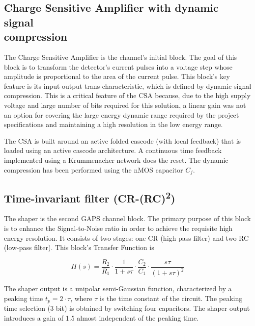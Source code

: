 
\subsection[Charge Sensitive Amplifier with dynamic signal compression]{Charge Sensitive Amplifier with dynamic signal \\compression}
The Charge Sensitive Amplifier is the channel's initial block. The goal of this block is to transform the detector's current pulses into a voltage step whose amplitude is proportional to the area of the current pulse. This block's key feature is its input-output trans-characteristic, which is defined by  dynamic signal compression. This is a critical feature of the CSA because, due to the high supply voltage and large number of bits required for this solution, a linear gain was not an option for covering the large energy dynamic range required by the project specifications and maintaining a high resolution in the low energy range.

\par
The CSA is built around an active folded cascode (with local feedback) that is loaded using an active cascode architecture. A continuous time feedback implemented using a Krummenacher network does the reset. The dynamic compression has been performed using the nMOS capacitor $C_f$.


\subsection{Time-invariant filter (CR-(RC)\textsuperscript{2})}
\label{shaper}
The shaper is the second GAPS channel block. The primary purpose of this block is to enhance the Signal-to-Noise ratio in order to achieve the requisite high energy resolution. It consists of two stages: one CR (high-pass filter) and two RC (low-pass filter). This block's Transfer Function is

\begin{equation}
    H(s) = \frac{R_2}{R_1} \cdot \frac{1}{1+s\tau} \cdot \frac{C_2}{C_1} \cdot \frac{s\tau}{(1+s\tau)^2}
\end{equation}

\noindent
The shaper output is a unipolar semi-Gaussian function, characterized by a peaking time $t_p = 2 \cdot \tau$, where $\tau$ is the time constant of the circuit. The peaking time selection (3 bit) is obtained by switching four capacitors. The shaper output introduces a gain of 1.5 almost independent of the peaking time.

